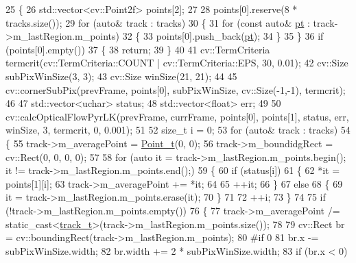 \begin{DoxyCode}
25 \{
26     std::vector<cv::Point2f> points[2];
27 
28     points[0].reserve(8 * tracks.size());
29     \textcolor{keywordflow}{for} (\textcolor{keyword}{auto}& track : tracks)
30     \{
31         \textcolor{keywordflow}{for} (\textcolor{keyword}{const} \textcolor{keyword}{auto}& \mbox{\hyperlink{rings_8cpp_af69bbacaaf68a115b351c5d1e29c3cc8}{pt}} : track->m\_lastRegion.m\_points)
32         \{
33             points[0].push\_back(\mbox{\hyperlink{rings_8cpp_af69bbacaaf68a115b351c5d1e29c3cc8}{pt}});
34         \}
35     \}
36     \textcolor{keywordflow}{if} (points[0].empty())
37     \{
38         \textcolor{keywordflow}{return};
39     \}
40 
41     cv::TermCriteria termcrit(cv::TermCriteria::COUNT | cv::TermCriteria::EPS, 30, 0.01);
42     cv::Size subPixWinSize(3, 3);
43     cv::Size winSize(21, 21);
44 
45     cv::cornerSubPix(prevFrame, points[0], subPixWinSize, cv::Size(-1,-1), termcrit);
46 
47     std::vector<uchar> status;
48     std::vector<float> err;
49 
50     cv::calcOpticalFlowPyrLK(prevFrame, currFrame, points[0], points[1], status, err, winSize, 3, termcrit,
       0, 0.001);
51 
52     \textcolor{keywordtype}{size\_t} i = 0;
53     \textcolor{keywordflow}{for} (\textcolor{keyword}{auto}& track : tracks)
54     \{
55         track->m\_averagePoint = \mbox{\hyperlink{defines_8h_a8c42696da8f098b91374a8e8bb84b430}{Point\_t}}(0, 0);
56         track->m\_boundidgRect = cv::Rect(0, 0, 0, 0);
57 
58         \textcolor{keywordflow}{for} (\textcolor{keyword}{auto} it = track->m\_lastRegion.m\_points.begin(); it != track->m\_lastRegion.m\_points.end();)
59         \{
60             \textcolor{keywordflow}{if} (status[i])
61             \{
62                 *it = points[1][i];
63                 track->m\_averagePoint += *it;
64 
65                 ++it;
66             \}
67             \textcolor{keywordflow}{else}
68             \{
69                 it = track->m\_lastRegion.m\_points.erase(it);
70             \}
71 
72             ++i;
73         \}
74 
75         \textcolor{keywordflow}{if} (!track->m\_lastRegion.m\_points.empty())
76         \{
77             track->m\_averagePoint /= \textcolor{keyword}{static\_cast<}\mbox{\hyperlink{defines_8h_a7ce9c8817b42ab418e61756f579549ab}{track\_t}}\textcolor{keyword}{>}(track->m\_lastRegion.m\_points.size());
78 
79             cv::Rect br = cv::boundingRect(track->m\_lastRegion.m\_points);
80 \textcolor{preprocessor}{#if 0}
81             br.x -= subPixWinSize.width;
82             br.width += 2 * subPixWinSize.width;
83             \textcolor{keywordflow}{if} (br.x < 0)

\end{DoxyCode}
